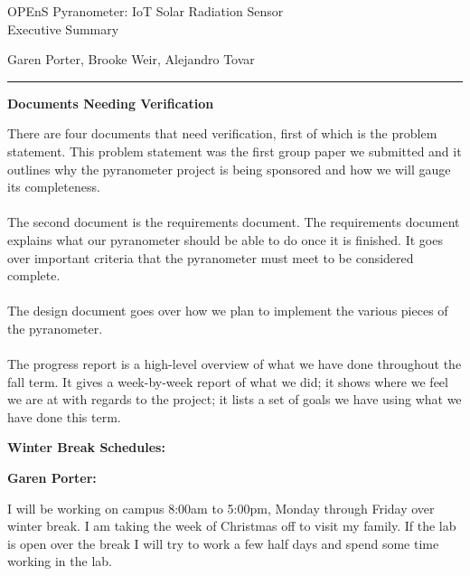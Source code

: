 \documentclass[10pt,draftclsnofoot,onecolumn,letterpaper]{article}
\begin{document}
\begin{Center}
{\fontsize{14pt}{16.8pt}\selectfont OPEnS Pyranometer: IoT Solar Radiation Sensor\\ Executive Summary\par}
\end{Center}\par
    
\begin{Center}
Garen Porter, Brooke Weir, Alejandro Tovar\\
\end{Center}\par
\hrule
\vspace{5pt}


{\fontsize{12pt}{16.8pt}\selectfont \textbf{Documents Needing Verification}\par}
{\fontsize{10pt}{12.0pt}\selectfont There are four documents that need verification, first of which is the problem statement. This problem statement was the first group paper we submitted and it outlines why the pyranometer project is being sponsored and how we will gauge its completeness.\\\\The second document is the requirements document. The requirements document explains what our pyranometer should be able to do once it is finished. It goes over important criteria that the pyranometer must meet to be considered complete.\\\\The design document goes over how we plan to implement the various pieces of the pyranometer.\\\\The progress report is a high-level overview of what we have done throughout the fall term. It gives a week-by-week report of what we did; it shows where we feel we are at with regards to the project; it lists a set of goals we have using what we have done this term.\\
\par}\par

{\fontsize{12pt}{16.8pt}\selectfont \textbf{Winter Break Schedules: }\par}
{\fontsize{12pt}{16.8pt}\selectfont \textbf{Garen Porter: }\par}
{\fontsize{10pt}{12.0pt}\selectfont I will be working on campus 8:00am to 5:00pm, Monday through Friday over winter break. I am taking the week of Christmas off to visit my family. If the lab is open over the break I will try to work a few half days and spend some time working in the lab.\\
\par}\par
\end{document}
